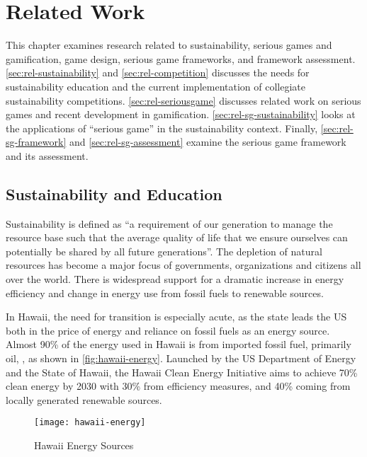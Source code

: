 \chapter{Related Work}
\label{cha:related-work}

This chapter examines research related to sustainability, serious games and gamification, game design, serious game frameworks, and framework assessment. \autoref{sec:rel-sustainability} and \autoref{sec:rel-competition} discusses the needs for sustainability education and the current implementation of collegiate sustainability competitions. \autoref{sec:rel-seriousgame} discusses related work on serious games and recent development in gamification. \autoref{sec:rel-sg-sustainability} looks at the applications of ``serious game'' in the sustainability context. Finally, \autoref{sec:rel-sg-framework} and \autoref{sec:rel-sg-assessment} examine the serious game framework and its assessment.

\section{Sustainability and Education}
\label{sec:rel-sustainability}

Sustainability is defined as ``a requirement of our generation to manage the
resource base such that the average quality of life that we ensure ourselves can potentially
be shared by all future generations''\cite{asheim1994sustainability}. The depletion of natural
resources has become a major focus of governments, organizations and citizens all over the world. 
There is widespread support for a dramatic increase in energy efficiency and change in
energy use from fossil fuels to renewable sources\cite{lenssen1996sustainable}. 

In Hawaii, the need for transition is especially acute, as the
state leads the US both in the price of energy and reliance on fossil fuels as an 
energy source. Almost 90\% of the energy used in Hawaii is from imported fossil fuel, primarily oil, \cite{hawaiienergypolicy}, as shown in \autoref{fig:hawaii-energy}. Launched by the US Department of Energy and the State of Hawaii, the Hawaii Clean Energy Initiative \cite{hcei} aims to achieve 70\% clean energy by 2030 with 30\% from efficiency measures, and 40\% coming from locally generated renewable sources.

\begin{figure}[ht!]
	\centering
		\texttt{[image: hawaii-energy]}
		\caption{ Hawaii Energy Sources \cite {hawaiienergypolicy}} 
		\label{fig:hawaii-energy}
\end{figure}

